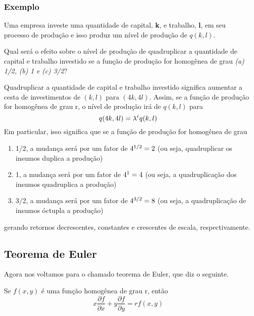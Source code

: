 \documentclass[a4paper]{article}
\begin{document}
\subsubsection*{Exemplo}
Uma empresa investe uma quantidade de capital, \textbf{k}, e trabalho, \textbf{l}, em seu processo de produção e isso produz um nível de produção de $q(k,l)$.

\par Qual será o efeito sobre o nível de produção de quadruplicar a quantidade de capital e trabalho investido se a função de produção for homogênea de grau \textit{(a) 1/2, (b) 1 e (c) 3/2}?
\par Quadruplicar a quantidade de capital e trabalho investido significa aumentar a cesta de investimentos de $(k,l)$ para $(4k,4l)$. Assim, se a função de produção for homogênea de grau r, o nível de produção irá de $q(k,l)$ para
\begin{equation}
    q(4k,4l) = \lambda\textsuperscript{r}q(k,l)
\end{equation}
Em particular, isso significa que se a função de produção for homogênea de grau
\begin{enumerate}[label = \alph*)]
    \item 1/2, a mudança será por um fator de $4\textsuperscript{1/2} = 2$ (ou seja, quadruplicar os insumos duplica a produção)
    \item 1, a mudança será por um fator de $4\textsuperscript{1} = 4$ (ou seja, a quadruplicação dos insumos quadruplica a produção)
    \item 3/2, a mudança será por um fator de $4\textsuperscript{3/2} = 8$ (ou seja, a quadruplicação de insumos óctupla a produção)
\end{enumerate}
gerando retornos decrescentes, constantes e crescentes de escala, respectivamente.
\subsection*{Teorema de Euler}
Agora nos voltamos para o chamado teorema de Euler, que diz o seguinte.

\par Se $f(x,y)$ é uma função homogênea de grau r, então
\begin{equation}
    x\frac{\partial f}{\partial x} + y\frac{\partial f}{\partial y} = rf(x,y)
\end{equation}
\end{document}
